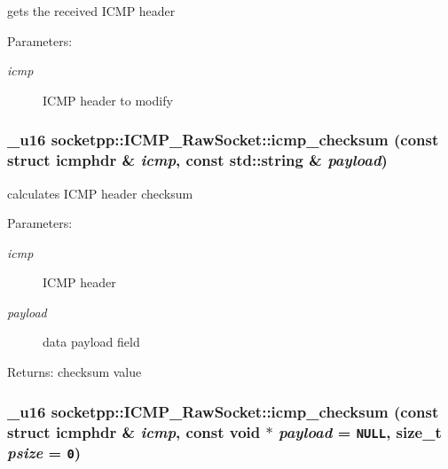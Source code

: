 gets the received ICMP header 

\begin{Desc}
\item[Parameters:]
\begin{description}
\item[{\em icmp}]ICMP header to modify \end{description}
\end{Desc}
\hypertarget{classsocketpp_1_1ICMP__RawSocket_eb8e83796aefe5a5dd7035490902a537}{
\subsubsection[{icmp\_\-checksum}]{\setlength{\rightskip}{0pt plus 5cm}\_\-u16 socketpp::ICMP\_\-RawSocket::icmp\_\-checksum (const struct icmphdr \& {\em icmp}, \/  const std::string \& {\em payload})}}
\label{classsocketpp_1_1ICMP__RawSocket_eb8e83796aefe5a5dd7035490902a537}


calculates ICMP header checksum 

\begin{Desc}
\item[Parameters:]
\begin{description}
\item[{\em icmp}]ICMP header \item[{\em payload}]data payload field \end{description}
\end{Desc}
\begin{Desc}
\item[Returns:]checksum value \end{Desc}
\hypertarget{classsocketpp_1_1ICMP__RawSocket_6c8a1364919485932221942c472ea95e}{
\subsubsection[{icmp\_\-checksum}]{\setlength{\rightskip}{0pt plus 5cm}\_\-u16 socketpp::ICMP\_\-RawSocket::icmp\_\-checksum (const struct icmphdr \& {\em icmp}, \/  const void $\ast$ {\em payload} = {\tt NULL}, \/  size\_\-t {\em psize} = {\tt 0})}}
\label{classsocketpp_1_1ICMP__RawSocket_6c8a1364919485932221942c472ea95e}


